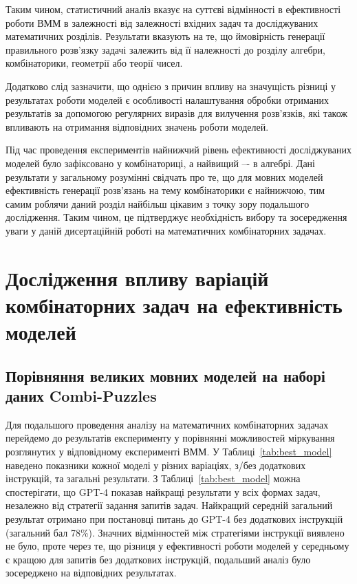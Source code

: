 Таким чином, статистичний аналіз вказує на суттєві відмінності в ефективності роботи ВММ в залежності від залежності вхідних задач та досліджуваних математичних розділів. Результати вказують на те, що ймовірність генерації правильного розв'язку задачі залежить від її належності до розділу алгебри, комбінаторики, геометрії або теорії чисел.

Додатково слід зазначити, що однією з причин впливу на значущість різниці у результатах роботи моделей є особливості налаштування обробки отриманих результатів за допомогою регулярних виразів для вилучення розв'язків, які також впливають на отримання відповідних значень роботи моделей.

Під час проведення експериментів найнижчий рівень ефективності досліджуваних моделей було зафіксовано у комбінаториці, а найвищий –- в алгебрі. Дані результати у загальному розумінні свідчать про те, що для мовних моделей ефективність генерації розв'язань на тему комбінаторики є найнижчою, тим самим роблячи даний розділ найбільш цікавим з точку зору подальшого дослідження. Таким чином, це підтверджує необхідність вибору та зосередження уваги у даній дисертаційній роботі на математичних комбінаторних задачах.

\section{Дослідження впливу варіацій комбінаторних задач на ефективність моделей}

\subsection{Порівняння великих мовних моделей на наборі даних Combi-Puzzles} 
Для подальшого проведення аналізу на математичних комбінаторних задачах перейдемо до результатів експерименту у порівнянні можливостей міркування розглянутих у відповідному експерименті ВММ. У Таблиці~\ref{tab:best_model} наведено показники кожної моделі у різних варіаціях, з/без додаткових інструкцій, та загальні результати. З Таблиці~\ref{tab:best_model} можна спостерігати, що GPT-4 показав найкращі результати у всіх формах задач, незалежно від стратегії задання запитів задач. Найкращий середній загальний результат отримано при постановці питань до GPT-4 без додаткових інструкцій (загальний бал 78\%). Значних відмінностей між стратегіями інструкції виявлено не було, проте через те, що різниця у ефективності роботи моделей у середньому є кращою для запитів без додаткових інструкцій, подальший аналіз було зосереджено на відповідних результатах.

